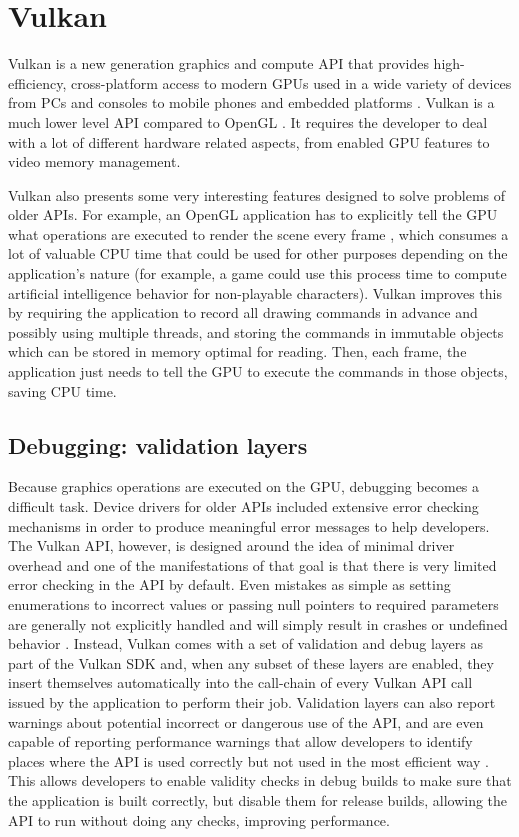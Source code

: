 \chapter{Vulkan}
Vulkan is a new generation graphics and compute API that provides high-efficiency, cross-platform access to modern GPUs used in a wide variety of devices from PCs and consoles to mobile phones and embedded platforms \cite{vulkan}. Vulkan is a much lower level API compared to OpenGL \cite{sellers:2016}. It requires the developer to deal with a lot of different hardware related aspects, from enabled GPU features to video memory management.

Vulkan also presents some very interesting features designed to solve problems of older APIs. For example, an OpenGL application has to explicitly tell the GPU what operations are executed to render the scene every frame \cite{opengl_spec}, which consumes a lot of valuable CPU time that could be used for other purposes depending on the application's nature (for example, a game could use this process time to compute artificial intelligence behavior for non-playable characters). Vulkan improves this by requiring the application to record all drawing commands in advance and possibly using multiple threads, and storing the commands in immutable objects which can be stored in memory optimal for reading. Then, each frame, the application just needs to tell the GPU to execute the commands in those objects, saving CPU time.

\section{Debugging: validation layers}
Because graphics operations are executed on the GPU, debugging becomes a difficult task. Device drivers for older APIs included extensive error checking mechanisms in order to produce meaningful error messages to help developers. The Vulkan API, however, is designed around the idea of minimal driver overhead and one of the manifestations of that goal is that there is very limited error checking in the API by default. Even mistakes as simple as setting enumerations to incorrect values or passing null pointers to required parameters are generally not explicitly handled and will simply result in crashes or undefined behavior \cite{vulkan_tutorial}. Instead, Vulkan comes with a set of validation and debug layers as part of the Vulkan SDK and, when any subset of these layers are enabled, they insert themselves automatically into the call-chain of every Vulkan API call issued by the application to perform their job. Validation layers can also report warnings about potential incorrect or dangerous use of the API, and are even capable of reporting performance warnings that allow developers to identify places where the API is used correctly but not used in the most efficient way \cite{vulkan_validation_layers}. This allows developers to enable validity checks in debug builds to make sure that the application is built correctly, but disable them for release builds, allowing the API to run without doing any checks, improving performance.


